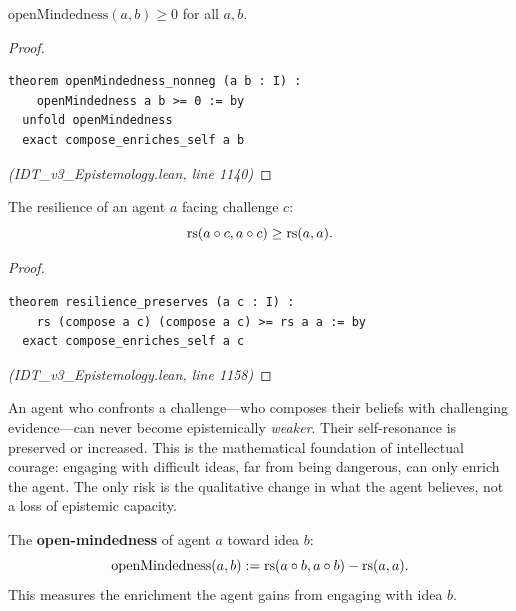 \begin{theorem}
\label{thm:openmindedness-nonneg}
$\mathrm{openMindedness}(a, b) \geq 0$ for all $a, b$.
\end{theorem}

\begin{proof}
\begin{lstlisting}
theorem openMindedness_nonneg (a b : I) :
    openMindedness a b >= 0 := by
  unfold openMindedness
  exact compose_enriches_self a b
\end{lstlisting}
\textit{(IDT\_v3\_Epistemology.lean, line 1140)}
\end{proof}

\begin{theorem}
\label{thm:epistemic-resilience}
The resilience of an agent $a$ facing challenge $c$:
\[
  \mathrm{rs}(a \circ c, a \circ c) \geq \mathrm{rs}(a, a).
\]
\end{theorem}

\begin{proof}
\begin{lstlisting}
theorem resilience_preserves (a c : I) :
    rs (compose a c) (compose a c) >= rs a a := by
  exact compose_enriches_self a c
\end{lstlisting}
\textit{(IDT\_v3\_Epistemology.lean, line 1158)}
\end{proof}

\begin{interpretation}
An agent who confronts a challenge---who composes their beliefs with challenging
evidence---can never become epistemically \emph{weaker}. Their self-resonance
is preserved or increased. This is the mathematical foundation of intellectual
courage: engaging with difficult ideas, far from being dangerous, can only
enrich the agent. The only risk is the qualitative change in what the agent
believes, not a loss of epistemic capacity.
\end{interpretation}

\begin{definition}
\label{def:open-mindedness}
The \textbf{open-mindedness} of agent $a$ toward idea $b$:
\[
  \mathrm{openMindedness}(a, b) := \mathrm{rs}(a \circ b, a \circ b) - \mathrm{rs}(a, a).
\]
This measures the enrichment the agent gains from engaging with idea $b$.
\end{definition}

